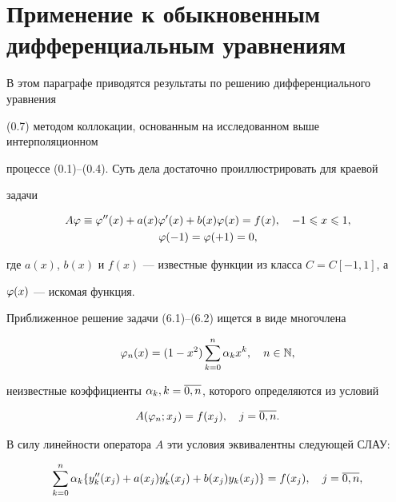 \section{Применение к обыкновенным дифференциальным уравнениям}





В этом параграфе приводятся результаты по решению дифференциального уравнения 


(0.7) методом коллокации, основанным на исследованном выше интерполяционном


процессе (0.1)--(0.4). Суть дела достаточно проиллюстрировать для краевой


задачи


\begin{gather}


A\vp\equiv \vp{}''(x)+a(x)\vp{}'(x)+b(x)\vp(x)=f(x),\quad -1\lea x\lea 1, \\


%


\vp(-1)=\vp(+1)=0,


\end{gather}


где $a(x)$, $b(x)$ и $f(x)$ --- известные функции из класса $C=C[-1,1]$, а


$\varphi(x)$ --- искомая функция.





Приближенное решение задачи (6.1)--(6.2) ищется в виде многочлена


\begin{equation}


\vp_n(x)=(1-x^2)\sum_{k=0}^n\al_kx^k,\quad n\in \N,


\end{equation}


неизвестные коэффициенты $\alpha_k,k=\overline{0,n}$, которого определяются из условий


\begin{equation}


A(\vp_n;x_j)=f(x_j),\quad j=\ol{0,n}.


\end{equation}


В силу линейности оператора $A$ эти условия эквивалентны следующей СЛАУ:


\begin{equation}


\sum_{k=0}^n\al_k\{ y_k''(x_j)+a(x_j)y_k'(x_j)+b(x_j)y_k(x_j)\}=


f(x_j),\quad j=\ol{0,n},


\end{equation}


